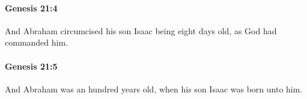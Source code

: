 		\paragraph{Genesis 21:4} %
			\label{GENESIS-21-4}

			And Abraham circumcised his son Isaac being eight days old, as God had commanded him.


		\paragraph{Genesis 21:5} %
			\label{GENESIS-21-5}

			And Abraham was an hundred years old, when his son Isaac was born unto him.



